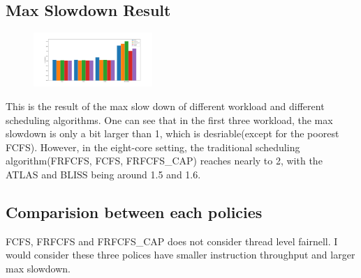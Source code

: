 \documentclass[letterpaper,twocolumn]{article}
\begin{document}
\subsection{Max Slowdown Result}
\begin{figure}[!h]
\includegraphics[width=0.4\textwidth]{Figure_2.png}
\end{figure}
This is the result of the max slow down of different workload and different scheduling algorithms. 
One can see that in the first three workload, the max slowdown is only a bit larger than 1, which is desriable(except for the poorest FCFS).
However, in the eight-core setting, the traditional scheduling algorithm(FRFCFS, FCFS, FRFCFS\_CAP) reaches nearly to 2, with the ATLAS and BLISS 
being around 1.5 and 1.6. 
\subsection{Comparision between each policies}
FCFS, FRFCFS and FRFCFS\_CAP does not consider thread level fairnell. I would consider these three 
polices have smaller instruction throughput and larger max slowdown.

%
%
%
%
%
%


\end{document}
